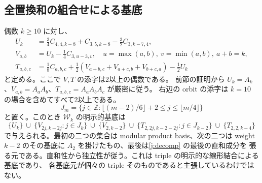 \documentclass[12pt]{amsart}
\theoremstyle{definition}
\theoremstyle{remark}
\numberwithin{equation}{section}
\newcommand{\Z}{\mathbb{Z}}
\newcommand{\WW}{\mathcal W}
\numberwithin{equation}{section}
\begin{document}
\subsection{全置換和の組合せによる基底}\label{j:basis}
偶数 $k\ge10$ に対し、
\begin{align}
 U_k&=\tfrac34 C_{4,4,k-8}+C_{3,5,k-8}-\tfrac32 C_{3,k-7,4},\label{j:U}\\
 V_{a,b}&=U_k-\tfrac14 C_{3,u-3,v},\quad
 u=\max(a,b),\ v=\min(a,b),\ a+b=k,\label{j:V}\\
 T_{a,b,c}&=\tfrac18 C_{a,b,c}
  +\tfrac12(V_{a+b,c}+V_{a+c,b}+V_{b+c,a})-\tfrac12 U_k
 \label{j:T}
\end{align}
と定める。ここで $V,T$ の添字は2以上の偶数である。
前節の証明から $U_k=A_k$、$V_{a,b}=A_aA_b$、$T_{a,b,c}=A_aA_bA_c$ が厳密に従う。
右辺の orbit の添字は $k=10$ の場合を含めてすべて2以上である。
\[
 J_m=\{j\in\Z:\lfloor(m-2)/6\rfloor+2\le j\le\lfloor m/4\rfloor\}
\]
と置く。このとき $\WW_k$ の明示的基底は
\begin{equation}\label{j:basisformula}
 \{U_k\}\ \cup\ \{V_{2j,k-2j}:j\in J_k\}
 \ \cup\ \{V_{2,k-2}\}
 \ \cup\ \{T_{2,2j,k-2-2j}:j\in J_{k-2}\}
 \ \cup\ \{T_{2,2,k-4}\}
\end{equation}
で与えられる。最初の二つの集合は modular product basis、次の二つは weight
$k-2$ のその基底に $A_2$ を掛けたもの、最後は\eqref{j:decomp} の最後の直和成分を
張る元である。直和性から独立性が従う。これは triple の明示的な線形結合による基底であり、
各基底元が個々の triple そのものであると主張しているわけではない。
\end{document}
